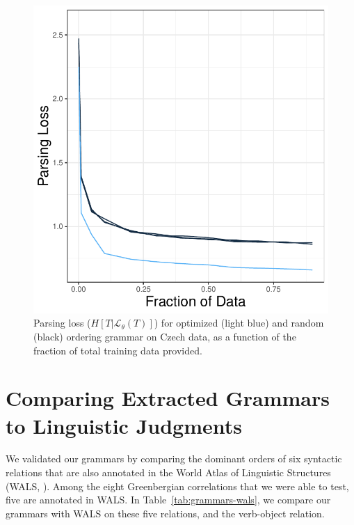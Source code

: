 \documentclass[10pt,twoside,lineno]{article}
\begin{document}
\begin{figure}[ht]
    \centering
    \includegraphics[scale=.4]{../results/learning-curves/figures/learning-parser-czech-logloss.pdf} 

        \caption{Parsing loss ($H[T|\mathcal{L}_\theta(T)]$) for optimized (light blue) and random (black) ordering grammar on Czech data, as a function of the fraction of total training data provided.}
    \label{fig:learning-czech}
\end{figure}







\section{Comparing Extracted Grammars to Linguistic Judgments}


We validated our grammars by comparing the dominant orders of six syntactic relations that are also annotated in the World Atlas of Linguistic Structures (WALS, \cite{haspelmath2005world}).
Among the eight Greenbergian correlations that we were able to test, five are annotated in WALS.
In Table~\ref{tab:grammars-wals}, we compare our grammars with WALS on these five relations, and the verb-object relation.
\end{document}
